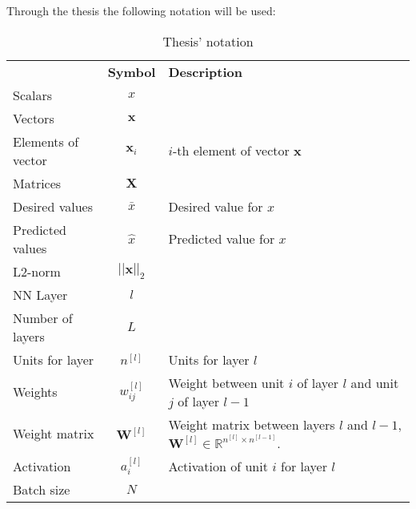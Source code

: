 
{}

Through the thesis the following notation will be used:

\begin{table}[H]
  \centering
  \begin{tabular}{l|c|p{6cm}}
     & \textbf{Symbol} & \textbf{Description} \\
    \hhline{===}
    Scalars & \( x \) & \\
    Vectors & \( \bm{x} \) & \\
    Elements of vector & \( \bm{x}_i \) & \( i \)-th element of vector \( \bm{x} \) \\
    Matrices & \(\bm{X}\) & \\
    Desired values & \( \bar{x} \) & Desired value for \( x \) \\
    Predicted values & \( \hat{x} \) & Predicted value for \( x \) \\
    L2-norm & \( ||\bm{x}||_2 \) & \\
    \hline
    NN Layer & \( l \) & \\
    Number of layers & \( L \) & \\
    Units for layer & \( n^{[l]} \) & Units for layer \( l \) \\
    Weights & \( w_{ij}^{[l]} \) & Weight between unit \( i \) of layer \( l \) and unit
    \( j \) of layer \( l - 1 \) \\
    Weight matrix & \( \bm{W}^{[l]} \) & Weight 
    matrix between layers \( l \) and \( l - 1 \), 
    \( \bm{W}^{[l]} \in \mathbb{R}^{n^{[l]} \times n^{[l - 1]}} \). \\
    Activation & \( a_i^{[l]} \) & Activation of unit \( i \) for layer \( l \) \\
    Batch size & \( N \) & \\
  \end{tabular}
  \caption{Thesis' notation}
\end{table}

